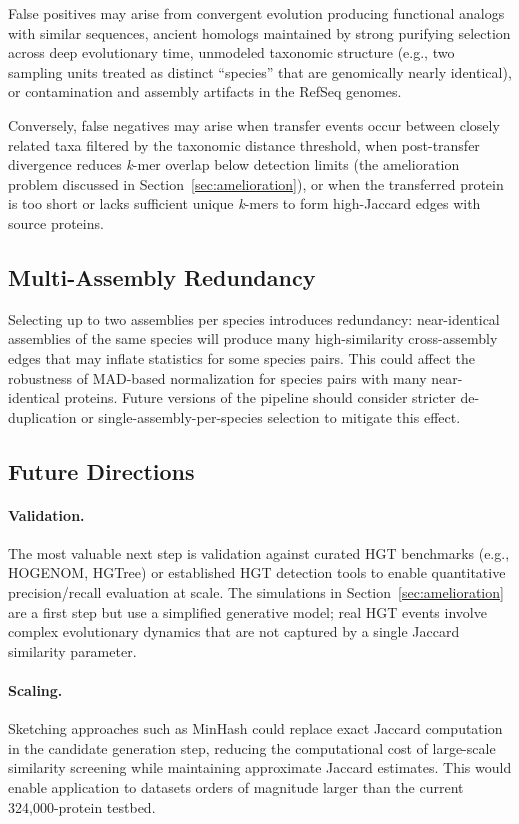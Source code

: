 \documentclass[11pt]{article}
\begin{document}
False positives may arise from convergent evolution producing functional analogs with similar sequences, ancient homologs maintained by strong purifying selection across deep evolutionary time, unmodeled taxonomic structure (e.g., two sampling units treated as distinct ``species'' that are genomically nearly identical), or contamination and assembly artifacts in the RefSeq genomes.

Conversely, false negatives may arise when transfer events occur between closely related taxa filtered by the taxonomic distance threshold, when post-transfer divergence reduces \textit{k}-mer overlap below detection limits (the amelioration problem discussed in Section~\ref{sec:amelioration}), or when the transferred protein is too short or lacks sufficient unique \textit{k}-mers to form high-Jaccard edges with source proteins.

\subsection{Multi-Assembly Redundancy}
\label{subsec:redundancy}

Selecting up to two assemblies per species introduces redundancy: near-identical assemblies of the same species will produce many high-similarity cross-assembly edges that may inflate statistics for some species pairs. This could affect the robustness of MAD-based normalization for species pairs with many near-identical proteins. Future versions of the pipeline should consider stricter de-duplication or single-assembly-per-species selection to mitigate this effect.

\subsection{Future Directions}

\paragraph{Validation.} The most valuable next step is validation against curated HGT benchmarks (e.g., HOGENOM, HGTree) or established HGT detection tools to enable quantitative precision/recall evaluation at scale. The simulations in Section~\ref{sec:amelioration} are a first step but use a simplified generative model; real HGT events involve complex evolutionary dynamics that are not captured by a single Jaccard similarity parameter.

\paragraph{Scaling.} Sketching approaches such as MinHash\cite{Broder1997,Ondov2016} could replace exact Jaccard computation in the candidate generation step, reducing the computational cost of large-scale similarity screening while maintaining approximate Jaccard estimates. This would enable application to datasets orders of magnitude larger than the current 324,000-protein testbed.
\end{document}
